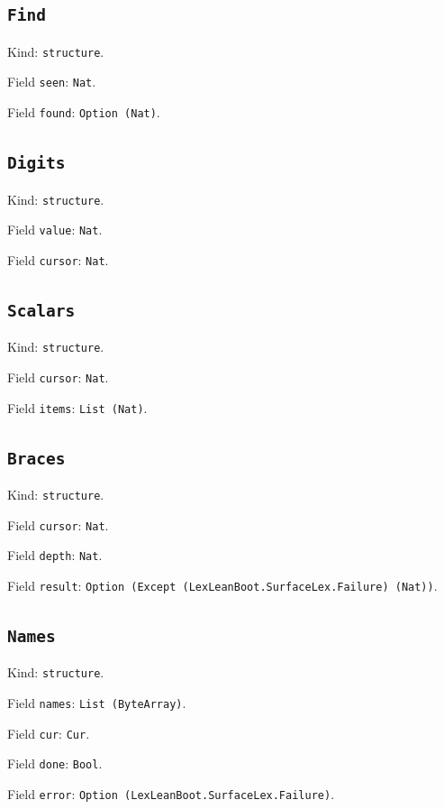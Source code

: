 \documentclass[11pt]{article}
\begin{document}
\subsection*{\texttt{Find}}
\noindent Kind: \texttt{structure}.\par
\noindent Field \texttt{seen}: \texttt{Nat}.\par
\noindent Field \texttt{found}: \texttt{Option (Nat)}.\par
\subsection*{\texttt{Digits}}
\noindent Kind: \texttt{structure}.\par
\noindent Field \texttt{value}: \texttt{Nat}.\par
\noindent Field \texttt{cursor}: \texttt{Nat}.\par
\subsection*{\texttt{Scalars}}
\noindent Kind: \texttt{structure}.\par
\noindent Field \texttt{cursor}: \texttt{Nat}.\par
\noindent Field \texttt{items}: \texttt{List (Nat)}.\par
\subsection*{\texttt{Braces}}
\noindent Kind: \texttt{structure}.\par
\noindent Field \texttt{cursor}: \texttt{Nat}.\par
\noindent Field \texttt{depth}: \texttt{Nat}.\par
\noindent Field \texttt{result}: \texttt{Option (Except (LexLeanBoot.SurfaceLex.Failure) (Nat))}.\par
\subsection*{\texttt{Names}}
\noindent Kind: \texttt{structure}.\par
\noindent Field \texttt{names}: \texttt{List (ByteArray)}.\par
\noindent Field \texttt{cur}: \texttt{Cur}.\par
\noindent Field \texttt{done}: \texttt{Bool}.\par
\noindent Field \texttt{error}: \texttt{Option (LexLeanBoot.SurfaceLex.Failure)}.\par
\end{document}
